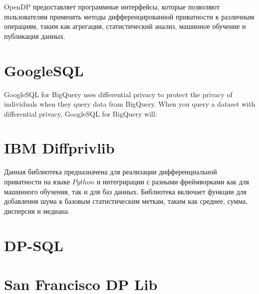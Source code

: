 OpenDP предоставляет программные интерфейсы, которые позволяют пользователям применять методы дифференцированной приватности к различным операциям, таким как агрегация, статистический анализ, машинное обучение и публикация данных.~\cite{Gaboardi2020}


\section{GoogleSQL}

GoogleSQL for BigQuery uses differential privacy to protect the privacy of individuals when they query data from BigQuery. When you query a dataset with differential privacy, GoogleSQL for BigQuery will:

\section{IBM Diffprivlib}
Данная библиотека предназначена для реализации дифференциальной приватности на языке $Python$ и интегрирации с разными фреймворками как для машинного обучения, так и для баз данных.
Библиотека включает функции для добавления шума к базовым статистическим меткам, таким как среднее, сумма, дисперсия и медиана.~\cite{diffprivlibibmdifferentialprivacy}


\section{DP-SQL}

\section{San Francisco DP Lib}
